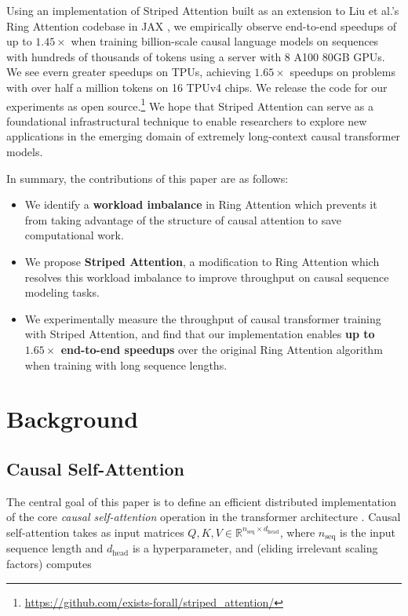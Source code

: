 Using an implementation of Striped Attention built as an extension to Liu et al.'s Ring Attention codebase in JAX \cite{jax2018github}, we empirically observe end-to-end speedups of up to $1.45\times$ when training billion-scale causal language models on sequences with hundreds of thousands of tokens using a server with 8 A100 80GB GPUs. We see evern greater speedups on TPUs, achieving $1.65\times$ speedups on problems with over half a million tokens on 16 TPUv4 chips. We release the code for our experiments as open source.\footnote{\href{https://github.com/exists-forall/striped_attention/}{https://github.com/exists-forall/striped\_attention/}} We hope that Striped Attention can serve as a foundational infrastructural technique to enable researchers to explore new applications in the emerging domain of extremely long-context causal transformer models.

In summary, the contributions of this paper are as follows:

\begin{itemize}[noitemsep, topsep=0pt]
    \item We identify a \textbf{workload imbalance} in Ring Attention which prevents it from taking advantage of the structure of causal attention to save computational work.
    \item We propose \textbf{Striped Attention}, a modification to Ring Attention which resolves this workload imbalance to improve throughput on causal sequence modeling tasks.
    \item We experimentally measure the throughput of causal transformer training with Striped Attention, and find that our implementation enables \textbf{up to $\mathbf{1.65\times}$ end-to-end speedups} over the original Ring Attention algorithm when training with long sequence lengths.
\end{itemize}

\section{Background}

\subsection{Causal Self-Attention}

The central goal of this paper is to define an efficient distributed implementation of the core \emph{causal self-attention} operation in the transformer architecture \cite{transformer}. Causal self-attention takes as input matrices $Q, K, V \in \mathbb{R}^{n_\text{seq} \times d_\text{head}}$, where $n_\text{seq}$ is the input sequence length and $d_\text{head}$ is a hyperparameter, and (eliding irrelevant scaling factors) computes

